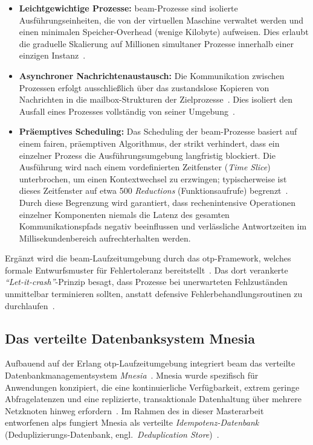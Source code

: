 \begin{itemize}
    \item \textbf{Leichtgewichtige Prozesse:} \gls{beam}-Prozesse sind isolierte Aus\-füh\-rungs\-ein\-hei\-ten, die von der virtuellen Maschine verwaltet werden und einen minimalen Speicher-Overhead (wenige Kilobyte) aufweisen. Dies erlaubt die graduelle Skalierung auf Millionen simultaner Prozesse innerhalb einer einzigen Instanz~\citep{armstrong2003making, armstrong2007programming}.

    \item \textbf{Asynchroner Nachrichtenaustausch:} Die Kommunikation zwischen Prozessen erfolgt ausschließlich über das zustandslose Kopieren von Nachrichten in die mailbox-Strukturen der Zielprozesse~\citep{agha1986actors}. Dies isoliert den Ausfall eines Prozesses vollständig von seiner Umgebung~\citep{armstrong2003making, virding1996concurrent}.

    \item \textbf{Präemptives Scheduling:} Das Scheduling der \gls{beam}-Prozesse basiert auf einem fairen, präemptiven Algorithmus, der strikt verhindert, dass ein einzelner Prozess die Ausführungsumgebung langfristig blockiert. Die Ausführung wird nach einem vordefinierten Zeitfenster (\textit{Time Slice}) unterbrochen, um einen Kontextwechsel zu erzwingen; typischerweise ist dieses Zeitfenster auf etwa 500 \textit{Reductions} (Funktionsaufrufe) begrenzt~\citep{cesarini2009erlang, christakis2013systematic}. Durch diese Begrenzung wird garantiert, dass rechenintensive Operationen einzelner Komponenten niemals die Latenz des gesamten Kommunikationspfads negativ beeinflussen und verlässliche Antwortzeiten im Millisekundenbereich aufrechterhalten werden.
\end{itemize}

Ergänzt wird die \gls{beam}-Laufzeitumgebung durch das \gls{otp}-Framework, welches formale Entwurfsmuster für Fehlertoleranz bereitstellt~\citep{logan2011erlang}. Das dort verankerte \textit{\enquote{Let-it-crash}}-Prinzip besagt, dass Prozesse bei unerwarteten Fehlzuständen unmittelbar terminieren sollten, anstatt defensive Fehlerbehandlungsroutinen zu durchlaufen~\citep{logan2011erlang}.

\subsection{Das verteilte Datenbanksystem Mnesia}
\label{subsec:grundlagen_mnesia}

Aufbauend auf der Erlang \gls{otp}-Laufzeitumgebung integriert \gls{beam} das verteilte Datenbankmanagementsystem \textit{Mnesia}~\citep{mattsson1999mnesia, mnesia}. Mnesia wurde spezifisch für Anwendungen konzipiert, die eine kontinuierliche Verfügbarkeit, extrem geringe Abfragelatenzen und eine replizierte, transaktionale Datenhaltung über mehrere Netzknoten hinweg erfordern~\citep{mattsson1999mnesia}. Im Rahmen des in dieser Masterarbeit entworfenen \gls{alps} fungiert Mnesia als verteilte \textit{Idempotenz-Datenbank} (Deduplizierungs-Datenbank, engl.\ \textit{Deduplication Store})~\citep{helland2012idempotence}.

